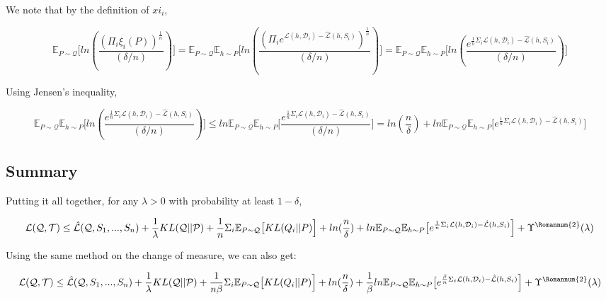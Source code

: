 \documentclass[letterpaper]{article}
\theoremstyle{definition}
\begin{document}
We note that by the definition of $xi_i$,

$$\mathbb{E}_{P\sim \mathcal{Q}} \bigl [ ln(\frac{(\Pi_i\xi_i(P))^{\frac{1}{n}}}{(\delta/n)}) \Bigr ] = 
\mathbb{E}_{P\sim \mathcal{Q}} \mathbb{E}_{h\sim P} \bigl [ ln(\frac{(\Pi_i e^{\mathcal{L}(h, \mathcal{D}_i)- \hat{\mathcal{L}}(h, S_i)})^{\frac{1}{n}}}{(\delta/n)}) \Bigr ] = 
\mathbb{E}_{P\sim \mathcal{Q}} \mathbb{E}_{h\sim P} \bigl [ ln(\frac{ e^{\frac{1}{n}\Sigma_i\mathcal{L}(h, \mathcal{D}_i)- \hat{\mathcal{L}}(h, S_i)}}{(\delta/n)}) \Bigr ]$$

Using Jensen's inequality,

$$\mathbb{E}_{P\sim \mathcal{Q}} \mathbb{E}_{h\sim P} \bigl [ ln(\frac{ e^{\frac{1}{n}\Sigma_i\mathcal{L}(h, \mathcal{D}_i)- \hat{\mathcal{L}}(h, S_i)}}{(\delta/n)}) \Bigr ] \leq ln \mathbb{E}_{P\sim \mathcal{Q}} \mathbb{E}_{h\sim P} \bigl [ \frac{ e^{\frac{1}{n}\Sigma_i\mathcal{L}(h, \mathcal{D}_i)- \hat{\mathcal{L}}(h, S_i)}}{(\delta/n)} \Bigr ] = ln(\frac{n}{\delta})+ ln \mathbb{E}_{P\sim \mathcal{Q}} \mathbb{E}_{h\sim P} \bigl [ e^{\frac{1}{n}\Sigma_i\mathcal{L}(h, \mathcal{D}_i)- \hat{\mathcal{L}}(h, S_i)} \Bigr ]$$

\subsection{Summary}

Putting it all together, for any $\lambda>0$ with probability at least $1-\delta$,

$$\mathcal{L}(\mathcal{Q}, \mathcal{T}) \leq \hat{\mathcal{L}}(\mathcal{Q}, S_1,...,S_n) + \frac{1}{\lambda} KL(\mathcal{Q}||\mathcal{P}) + \frac{1}{n}\Sigma_i \mathbb{E}_{P\sim \mathcal{Q}} \bigl [KL(Q_i||P) \Bigr ] + ln(\frac{n}{\delta})+ ln \mathbb{E}_{P\sim \mathcal{Q}} \mathbb{E}_{h\sim P} \bigl [ e^{\frac{1}{n}\Sigma_i\mathcal{L}(h, \mathcal{D}_i)- \hat{\mathcal{L}}(h, S_i)} \Bigr ] +\Upsilon^{\text{\Romannum{2}}}(\lambda)$$

Using the same method on the change of measure, we can also get:

$$\mathcal{L}(\mathcal{Q}, \mathcal{T}) \leq \hat{\mathcal{L}}(\mathcal{Q}, S_1,...,S_n) + \frac{1}{\lambda} KL(\mathcal{Q}||\mathcal{P}) + \frac{1}{n\beta}\Sigma_i \mathbb{E}_{P\sim \mathcal{Q}} \bigl [KL(Q_i||P) \Bigr ] + ln(\frac{n}{\delta})+ \frac{1}{\beta}ln \mathbb{E}_{P\sim \mathcal{Q}} \mathbb{E}_{h\sim P} \bigl [ e^{\frac{\beta}{n}\Sigma_i\mathcal{L}(h, \mathcal{D}_i)- \hat{\mathcal{L}}(h, S_i)} \Bigr ] +\Upsilon^{\text{\Romannum{2}}}(\lambda)$$
\end{document}
